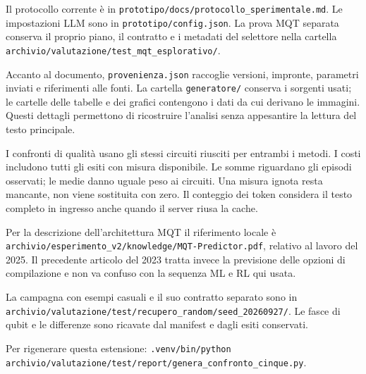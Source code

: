 Il protocollo corrente è in \nolinkurl{prototipo/docs/protocollo_sperimentale.md}. Le impostazioni LLM sono in \nolinkurl{prototipo/config.json}. La prova MQT separata conserva il proprio piano, il contratto e i metadati del selettore nella cartella \nolinkurl{archivio/valutazione/test_mqt_esplorativo/}.

Accanto al documento, \texttt{provenienza.json} raccoglie versioni, impronte, parametri inviati e riferimenti alle fonti. La cartella \texttt{generatore/} conserva i sorgenti usati; le cartelle delle tabelle e dei grafici contengono i dati da cui derivano le immagini. Questi dettagli permettono di ricostruire l’analisi senza appesantire la lettura del testo principale.

I confronti di qualità usano gli stessi circuiti riusciti per entrambi i metodi. I costi includono tutti gli esiti con misura disponibile. Le somme riguardano gli episodi osservati; le medie danno uguale peso ai circuiti. Una misura ignota resta mancante, non viene sostituita con zero. Il conteggio dei token considera il testo completo in ingresso anche quando il server riusa la cache.

Per la descrizione dell’architettura MQT il riferimento locale è \nolinkurl{archivio/esperimento_v2/knowledge/MQT-Predictor.pdf}, relativo al lavoro del 2025. Il precedente articolo del 2023 tratta invece la previsione delle opzioni di compilazione e non va confuso con la sequenza ML e RL qui usata.

La campagna con esempi casuali e il suo contratto separato sono in \nolinkurl{archivio/valutazione/test/recupero_random/seed_20260927/}. Le fasce di qubit e le differenze sono ricavate dal manifest e dagli esiti conservati.
\par Per rigenerare questa estensione: \texttt{.venv/bin/python} \nolinkurl{archivio/valutazione/test/report/genera_confronto_cinque.py}.
